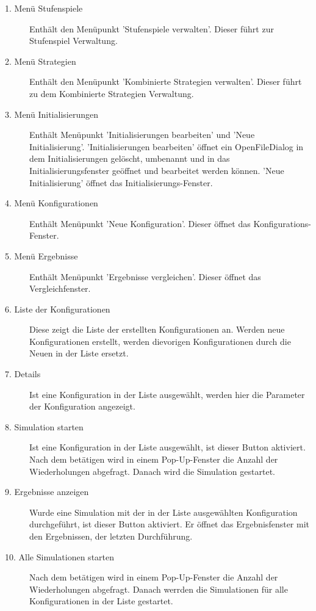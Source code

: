 \begin{description}


\item[1. Menü Stufenspiele] Enthält den Menüpunkt 'Stufenspiele verwalten'. Dieser führt zur Stufenspiel Verwaltung.

\item[2. Menü Strategien] Enthält den Menüpunkt 'Kombinierte Strategien verwalten'. Dieser führt zu dem Kombinierte Strategien Verwaltung.

\item[3. Menü Initialisierungen] Enthält Menüpunkt 'Initialisierungen bearbeiten' und 'Neue Initialisierung'. 'Initialisierungen bearbeiten' öffnet ein OpenFileDialog in dem Initialisierungen gelöscht, umbenannt und in das Initialisierungsfenster geöffnet und bearbeitet werden können. 'Neue Initialisierung' öffnet das Initialisierungs-Fenster.

\item[4. Menü Konfigurationen] Enthält Menüpunkt 'Neue Konfiguration'. Dieser öffnet das Konfigurations-Fenster.

\item[5. Menü Ergebnisse] Enthält Menüpunkt 'Ergebnisse vergleichen'. Dieser öffnet das Vergleichfenster.

\item[6. Liste der Konfigurationen] Diese zeigt die Liste der erstellten Konfigurationen an. Werden neue Konfigurationen erstellt, werden dievorigen Konfigurationen durch die Neuen in der Liste ersetzt.

\item[7. Details] Ist eine Konfiguration in der Liste ausgewählt, werden hier die Parameter der Konfiguration angezeigt.

\item[8. Simulation starten] Ist eine Konfiguration in der Liste ausgewählt, ist dieser Button aktiviert. Nach dem betätigen wird in einem Pop-Up-Fenster die Anzahl der Wiederholungen abgefragt. Danach wird die Simulation gestartet.

\item[9. Ergebnisse anzeigen] Wurde eine Simulation mit der in der Liste ausgewählten Konfiguration durchgeführt, ist dieser Button aktiviert. Er öffnet das Ergebnisfenster mit den Ergebnissen, der letzten Durchführung.

\item[10. Alle Simulationen starten] Nach dem betätigen wird in einem Pop-Up-Fenster die Anzahl der Wiederholungen abgefragt. Danach werrden die Simulationen für alle Konfigurationen in der Liste gestartet.

\end{description}

